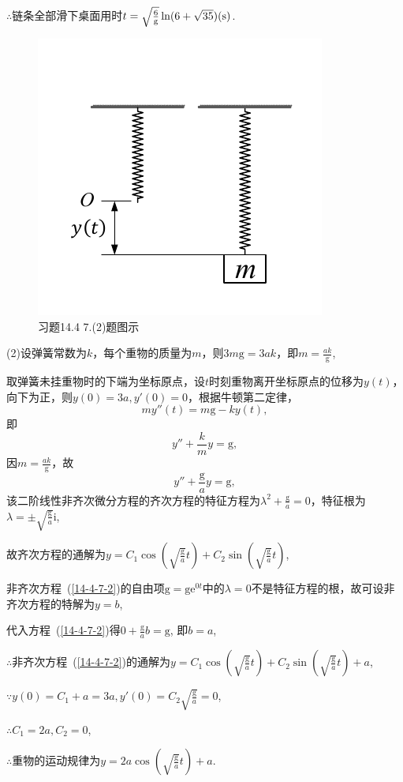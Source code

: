 \documentclass[12pt,UTF8]{ctexart}
\newcommand{\me}[0]{\mathrm e}
\newcommand{\m}[0]{\mathrm }
\begin{document}
\begin{enumerate}
$\therefore$链条全部滑下桌面用时$t=\sqrt{\frac6{\text g}}\ln(6+\sqrt{35})(\text{s})$.

\begin{figure}[H]
\begin{center}
\includegraphics[height=0.5\textheight]{Figures27/14-4-7-1.pdf}
\end{center}
\caption{习题14.4 7.(2)题图示}
\end{figure}

(2)设弹簧常数为$k$，每个重物的质量为$m$，则$3m\m g=3ak$，即$m=\frac{ak}{\m g}$,

取弹簧未挂重物时的下端为坐标原点，设$t$时刻重物离开坐标原点的位移为$y(t)$，向下为正，则$y(0)=3a,y'(0)=0$，根据牛顿第二定律，
\[my''(t)=m\m g-ky(t),\]
即\[y''+\frac kmy=\m g,\]
因$m=\frac{ak}{\m g}$，故
\begin{equation}\label{14-4-7-2}y''+\frac{\m g}ay=\m g,\end{equation}
该二阶线性非齐次微分方程的齐次方程的特征方程为$\lambda^2+\frac{\m g}a=0$，特征根为$\lambda=\pm\sqrt{\frac{\m g}a}\m i$,

故齐次方程的通解为$y=C_1\cos(\sqrt{\frac{\m g}a}t)+C_2\sin(\sqrt{\frac{\m g}a}t)$,

非齐次方程~(\ref{14-4-7-2})的自由项$\m g=\m g\me^{0t}$中的$\lambda=0$不是特征方程的根，故可设非齐次方程的特解为$y=b$, 

代入方程~(\ref{14-4-7-2})得$0+\frac{\m g}ab=\m g$, 即$b=a$,

$\therefore$非齐次方程~(\ref{14-4-7-2})的通解为$y=C_1\cos(\sqrt{\frac{\m g}a}t)+C_2\sin(\sqrt{\frac{\m g}a}t)+a$,

$\because y(0)=C_1+a=3a,y'(0)=C_2\sqrt{\frac{\m g}a}=0$,

$\therefore C_1=2a,C_2=0$,

$\therefore$重物的运动规律为$y=2a\cos(\sqrt{\frac{\m g}a}t)+a$.
\end{enumerate}
\end{document}
